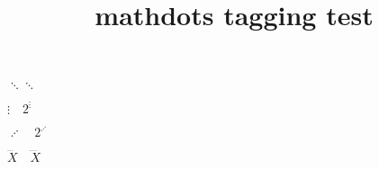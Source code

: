 \documentclass{article}
\title{mathdots tagging test}
\begin{document}
$\ddots${\large$\ddots$}

$\vdots\quad 2^{\vdots}$

$\iddots\quad 2^{\iddots}$

$\dddot{X}\quad \ddddot{X}$
\end{document}
